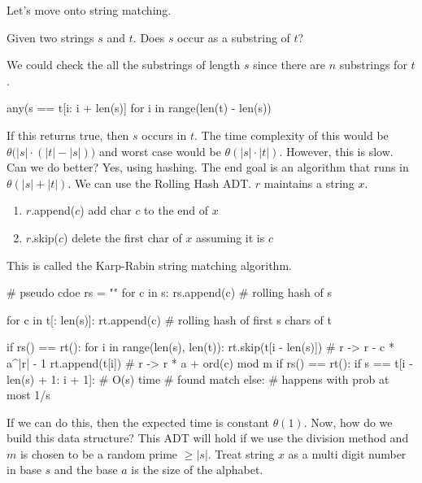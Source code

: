 Let's move onto string matching.
\begin{definition}
	Given two strings \(s\) and \(t\). Does \(s\) occur as a substring of \(t\)?
\end{definition}
\noindent
We could check the all the substrings of length \(s\) since there are \(n\) substrings for \(t\).
\begin{python}
any(s == t[i: i + len(s)] for i in range(len(t) - len(s))
\end{python}
If this returns true, then \(s\) occurs in \(t\). The time complexity of this would be 
\(\theta\big(\lvert s\rvert \cdot (\lvert t\rvert - \lvert s\rvert)\big)\) and worst case would be 
\(\theta(\lvert s\rvert\cdot\lvert t\rvert)\). However, this is slow. Can we do better? Yes, using hashing. The end
goal is an algorithm that runs in \(\theta(\lvert s\rvert + \lvert t\rvert)\). We can use the Rolling Hash ADT.
\(r\) maintains a string \(x\).
\begin{enumerate}
	\item \(r\).append(\(c\)) add char \(c\) to the end of \(x\)
	\item \(r\).skip(\(c\)) delete the first char of \(x\) assuming it is \(c\)
\end{enumerate}
This is called the Karp-Rabin string matching algorithm.
\begin{python}
	# pseudo cdoe
	rs = ""
	for c in s:
	  rs.append(c)  # rolling hash of s
	  
	for c in t[: len(s)]:
	  rt.append(c)  # rolling hash of first s chars of t
	  
	if rs() == rt():
	  for i in range(len(s), len(t)):
	    rt.skip(t[i - len(s)])
	    # r -> r - c * a^{|r| - 1}
	    rt.append(t[i])
	    # r -> r * a + ord(c) mod m
	    if rs() == rt():
	      if s == t[i - len(s) + 1: i + 1]:  # O(s) time
	        # found match
	      else:
	        # happens with prob at most 1/s
\end{python}
If we can do this, then the expected time is constant \(\theta(1)\). Now, how do we build this data structure?
This ADT will hold if we use the division method and \(m\) is chosen to be a random prime 
\(\geq\lvert s\rvert\). Treat string \(x\) as a multi digit number in base \(s\) and the base \(a\) is the size of the 
alphabet.


